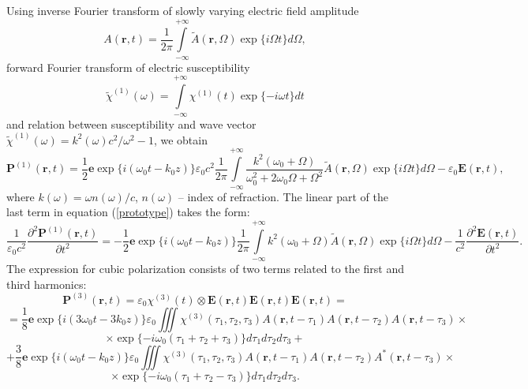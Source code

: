 \documentclass[a4paper, 12pt]{article}
\begin{document}
Using inverse Fourier transform of slowly varying electric field amplitude 
\begin{equation}
A(\mathbf{r}, t) = \frac1{2 \pi} \int\limits_{-\infty}^{+\infty} \tilde{A}(\mathbf{r}, \Omega) \exp \{ i \Omega t \} d \Omega,
\end{equation}
forward Fourier transform of electric susceptibility
\begin{equation}
\label{susceptibility_fourier}
\tilde{\chi}^{(1)}(\omega) = \int\limits_{-\infty}^{+\infty} \chi^{(1)}(t) \exp \{ -i \omega t \} dt
\end{equation}
and relation between susceptibility and wave vector $\tilde{\chi}^{(1)}(\omega) = k^2(\omega) c^2 / \omega^2 - 1$, we obtain
\begin{equation}
\mathbf{P}^{(1)}(\mathbf{r}, t) = \frac1{2}\mathbf{e} \exp\{i (\omega_0 t  - k_0 z)\} \varepsilon_0 c^2 \frac1{2 \pi} \int\limits_{-\infty}^{+\infty} \frac{k^2(\omega_0 + \Omega)}{\omega_0^2 + 2 \omega_0 \Omega + \Omega^2} \tilde{A}(\mathbf{r}, \Omega) \exp \{ i \Omega t \} d \Omega - \varepsilon_0 \mathbf{E}(\mathbf{r}, t),
\end{equation}
where $k(\omega) = \omega n(\omega)/ c$, $n(\omega)$ -- index of refraction. The linear part of the last term in equation (\ref{prototype}) takes the form:
\begin{equation}
\label{p1_derivative}
\frac1{\varepsilon_0 c^2} \frac{\partial^2 \mathbf{P}^{(1)}(\mathbf{r}, t)}{\partial t^2} = -\frac1{2}\mathbf{e} \exp\{i (\omega_0 t  - k_0 z)\}   \frac1{2 \pi} \int\limits_{-\infty}^{+\infty} k^2(\omega_0 + \Omega) \tilde{A}(\mathbf{r}, \Omega) \exp \{ i \Omega t \} d \Omega - \frac1{c^2} \frac{\partial^2 \mathbf{E}(\mathbf{r}, t)}{\partial t^2}.
\end{equation}
The expression for cubic polarization consists of two terms related to the first and third harmonics:
\[
\mathbf{P}^{(3)}(\mathbf{r}, t) = \varepsilon_0  \chi^{(3)}(t) \otimes \mathbf{E}(\mathbf{r}, t) \mathbf{E}(\mathbf{r}, t) \mathbf{E}(\mathbf{r}, t) =
\]
\[= \frac1{8} \mathbf{e} \exp \{ i (3 \omega_0 t - 3 k_0 z) \}\varepsilon_0  \iiint \chi^{(3)}(\tau_1, \tau_2, \tau_3) A(\mathbf{r}, t - \tau_1)  A(\mathbf{r}, t - \tau_2) A(\mathbf{r}, t - \tau_3) \times 
\]
\[
 \times \exp\{-i \omega_0 (\tau_1 + \tau_2 + \tau_3) \} d\tau_1 d\tau_2 d \tau_3 + 
\]
\[
+ \frac{3}{8} \mathbf{e} \exp \{ i (\omega_0 t - k_0 z) \} \varepsilon_0  \iiint \chi^{(3)}(\tau_1, \tau_2, \tau_3) A(\mathbf{r}, t - \tau_1)  A(\mathbf{r}, t - \tau_2)  A^*(\mathbf{r}, t - \tau_3) \times 
\]
\begin{equation}
\times \exp\{-i \omega_0 (\tau_1 + \tau_2 - \tau_3) \} d\tau_1 d\tau_2 d \tau_3.
\end{equation}
\end{document}
